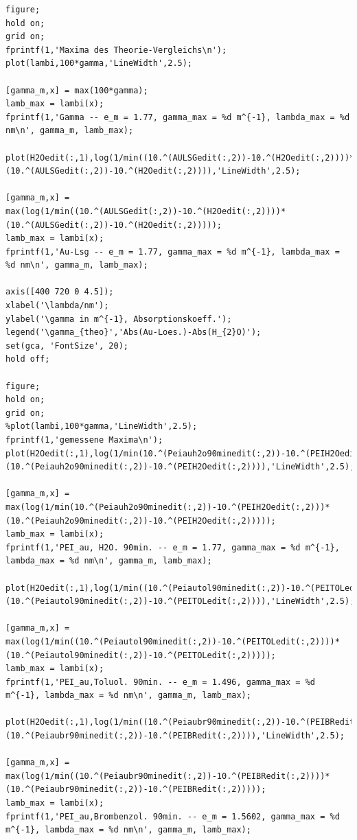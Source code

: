\documentclass[numbers=noenddot,a4paper,notitlepage,twoside,BCOR15mm]{scrartcl}
\begin{document}
\begin{lstlisting}
figure;
hold on;
grid on;
fprintf(1,'Maxima des Theorie-Vergleichs\n');
plot(lambi,100*gamma,'LineWidth',2.5);

[gamma_m,x] = max(100*gamma);
lamb_max = lambi(x);
fprintf(1,'Gamma -- e_m = 1.77, gamma_max = %d m^{-1}, lambda_max = %d nm\n', gamma_m, lamb_max);

plot(H2Oedit(:,1),log(1/min((10.^(AULSGedit(:,2))-10.^(H2Oedit(:,2))))*(10.^(AULSGedit(:,2))-10.^(H2Oedit(:,2)))),'LineWidth',2.5);

[gamma_m,x] = max(log(1/min((10.^(AULSGedit(:,2))-10.^(H2Oedit(:,2))))*(10.^(AULSGedit(:,2))-10.^(H2Oedit(:,2)))));
lamb_max = lambi(x);
fprintf(1,'Au-Lsg -- e_m = 1.77, gamma_max = %d m^{-1}, lambda_max = %d nm\n', gamma_m, lamb_max);

axis([400 720 0 4.5]);
xlabel('\lambda/nm');
ylabel('\gamma in m^{-1}, Absorptionskoeff.');
legend('\gamma_{theo}','Abs(Au-Loes.)-Abs(H_{2}O)');
set(gca, 'FontSize', 20);
hold off;

figure;
hold on;
grid on;
%plot(lambi,100*gamma,'LineWidth',2.5);
fprintf(1,'gemessene Maxima\n');
plot(H2Oedit(:,1),log(1/min(10.^(Peiauh2o90minedit(:,2))-10.^(PEIH2Oedit(:,2)))*(10.^(Peiauh2o90minedit(:,2))-10.^(PEIH2Oedit(:,2)))),'LineWidth',2.5);

[gamma_m,x] = max(log(1/min(10.^(Peiauh2o90minedit(:,2))-10.^(PEIH2Oedit(:,2)))*(10.^(Peiauh2o90minedit(:,2))-10.^(PEIH2Oedit(:,2)))));
lamb_max = lambi(x);
fprintf(1,'PEI_au, H2O. 90min. -- e_m = 1.77, gamma_max = %d m^{-1}, lambda_max = %d nm\n', gamma_m, lamb_max);

plot(H2Oedit(:,1),log(1/min((10.^(Peiautol90minedit(:,2))-10.^(PEITOLedit(:,2))))*(10.^(Peiautol90minedit(:,2))-10.^(PEITOLedit(:,2)))),'LineWidth',2.5);

[gamma_m,x] = max(log(1/min((10.^(Peiautol90minedit(:,2))-10.^(PEITOLedit(:,2))))*(10.^(Peiautol90minedit(:,2))-10.^(PEITOLedit(:,2)))));
lamb_max = lambi(x);
fprintf(1,'PEI_au,Toluol. 90min. -- e_m = 1.496, gamma_max = %d m^{-1}, lambda_max = %d nm\n', gamma_m, lamb_max);

plot(H2Oedit(:,1),log(1/min((10.^(Peiaubr90minedit(:,2))-10.^(PEIBRedit(:,2))))*(10.^(Peiaubr90minedit(:,2))-10.^(PEIBRedit(:,2)))),'LineWidth',2.5);

[gamma_m,x] = max(log(1/min((10.^(Peiaubr90minedit(:,2))-10.^(PEIBRedit(:,2))))*(10.^(Peiaubr90minedit(:,2))-10.^(PEIBRedit(:,2)))));
lamb_max = lambi(x);
fprintf(1,'PEI_au,Brombenzol. 90min. -- e_m = 1.5602, gamma_max = %d m^{-1}, lambda_max = %d nm\n', gamma_m, lamb_max);


\end{lstlisting}
\end{document}
